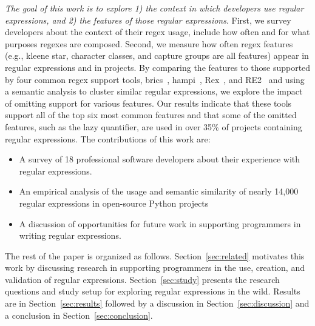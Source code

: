 \emph{The goal of this work is to explore 1) the context in which developers use regular expressions, and 2) the features of those regular expressions}. 
First, we survey developers about the context of their regex usage, include how often and for what purposes regexes are composed. 
Second, we measure how often regex features (e.g., kleene star, character classes, and capture groups are all features) appear in regular expressions and in projects. 
By comparing the features to those supported by four common regex support tools, brics~\cite{brics}, hampi~\cite{hampi}, Rex~\cite{rex}, and RE2~\cite{re2} and using a semantic analysis to cluster similar regular expressions, 
we explore the impact of omitting support for various features. 
Our results indicate that these tools support all of the top six most common features and that some of the omitted features, such as the lazy quantifier, are used in over 35\% of projects containing regular expressions.
The contributions of this work are:
\begin{itemize}
	\item A survey of 18 professional software developers about their experience with regular expressions.
	\item An empirical analysis of the usage and semantic similarity of nearly 14,000 regular expressions in  open-source Python projects
	\item A discussion of opportunities for future work in supporting programmers in writing regular expressions.
\end{itemize}

The rest of the paper is organized as follows. Section~\ref{sec:related} motivates this work by discussing research in supporting programmers in the use, creation, and validation of regular expressions. Section~\ref{sec:study} presents the research questions and study setup for exploring regular expressions in the wild. Results are in Section~\ref{sec:results} followed by a discussion in Section~\ref{sec:discussion} and a conclusion in Section~\ref{sec:conclusion}.
